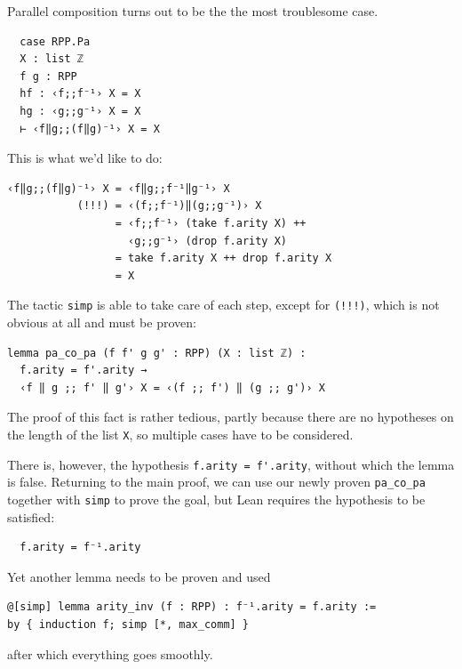 \documentclass{book}
\theoremstyle{definition}
\theoremstyle{remark}
\theoremstyle{plain}
\begin{document}
Parallel composition turns out to be the the most troublesome case.
\begin{lstlisting}
  case RPP.Pa
  X : list ℤ
  f g : RPP
  hf : ‹f;;f⁻¹› X = X
  hg : ‹g;;g⁻¹› X = X
  ⊢ ‹f‖g;;(f‖g)⁻¹› X = X
\end{lstlisting}
This is what we'd like to do:
\begin{lstlisting}
‹f‖g;;(f‖g)⁻¹› X = ‹f‖g;;f⁻¹‖g⁻¹› X
           (!!!) = ‹(f;;f⁻¹)‖(g;;g⁻¹)› X
                 = ‹f;;f⁻¹› (take f.arity X) ++
                   ‹g;;g⁻¹› (drop f.arity X)
                 = take f.arity X ++ drop f.arity X
                 = X
\end{lstlisting}
The tactic \lstinline{simp} is able to take care of each step, except for \lstinline{(!!!)},
which is not obvious at all and must be proven:
\begin{lstlisting}
lemma pa_co_pa (f f' g g' : RPP) (X : list ℤ) :
  f.arity = f'.arity →
  ‹f ‖ g ;; f' ‖ g'› X = ‹(f ;; f') ‖ (g ;; g')› X
\end{lstlisting}
The proof of this fact is rather tedious, partly because there are no hypotheses on the length of the list \lstinline{X},
so multiple cases have to be considered.

There is, however, the hypothesis \lstinline{f.arity = f'.arity}, without which the lemma is false.
Returning to the main proof, we can use our newly proven \lstinline{pa_co_pa} together with \lstinline{simp} to prove the goal,
but Lean requires the hypothesis to be satisfied:
\begin{lstlisting}
  f.arity = f⁻¹.arity
\end{lstlisting}
Yet another lemma needs to be proven and used
\begin{lstlisting}
@[simp] lemma arity_inv (f : RPP) : f⁻¹.arity = f.arity :=
by { induction f; simp [*, max_comm] }
\end{lstlisting}
after which everything goes smoothly.
\end{document}
